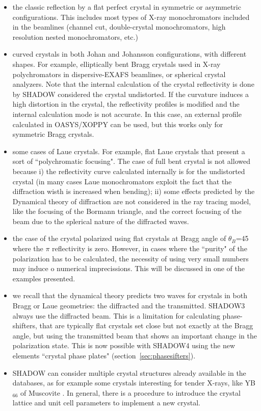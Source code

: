 \documentclass{iucr}
\begin{document}
\begin{itemize}
    \item the classic reflection by a flat perfect crystal in symmetric or asymmetric configurations. This includes most types of X-ray monochromators included in the beamlines (channel cut, double-crystal monochromators, high resolution nested monochromators, etc.)
    \item curved crystals in both Johan and Johansson configurations, with different shapes. For example, elliptically bent Bragg crystals used in X-ray polychromators in dispersive-EXAFS beamlines, or spherical crystal analyzers. Note that the internal calculation of the crystal reflectivity is done by SHADOW considered the crystal undistorted. If the curvature induces a high distortion in the crystal, the reflectivity profiles is modified and the internal calculation mode is not accurate. In this case, an external profile calculated in OASYS/XOPPY can be used, but this works only for symmetric Bragg crystals.
    \item some cases of Laue crystals. For example, flat Laue crystals that present a sort of ``polychromatic focusing". The case of full bent crystal is not allowed because i) the reflectivity curve calculated internally is for the undistorted crystal (in many cases Laue monochromators exploit the fact that the diffraction wisth is increased when bending); ii) some effects predicted by the Dynamical theory of diffraction are not considered in the ray tracing model, like the focusing of the Bormann triangle, and the correct focusing of the beam due to the splerical nature of the diffracted waves. 
    \item the case of the crystal polarized using flat crystals at Bragg angle of $\theta_B$=\SI{45}{\deg} where the $\pi$ reflectivity is zero. However, in cases where the ``purity" of the polarization has to be calculated, the necessity of using very small numbers may induce o numerical imprecissions. This will be discussed in one of the examples presented. 
    \item we recall that the dynamical theory predicts two waves for crystals in both Bragg or Laue geometries: the diffracted and the transmitted. SHADOW3 always use the diffracted beam. This is a limitation for calculating phase-shifters, that are typically flat crystals set close but not exactly at the Bragg angle, but using the transmitted beam that shows an important change in the polarization state. This is now possible with SHADOW4 using the new elements ``crystal phase plates" (section~\ref{sec:phasesifters}).
    \item SHADOW can consider multiple crystal structures already available in the databases, as for example some crystals interesting for tender X-rays, like YB$_{66}$ of Muscovite \cite{Yu_2022}. In general, there is a procedure to introduce the crystal lattice and unit cell parameters to implement a new crystal. 
\end{itemize}
\end{document}
